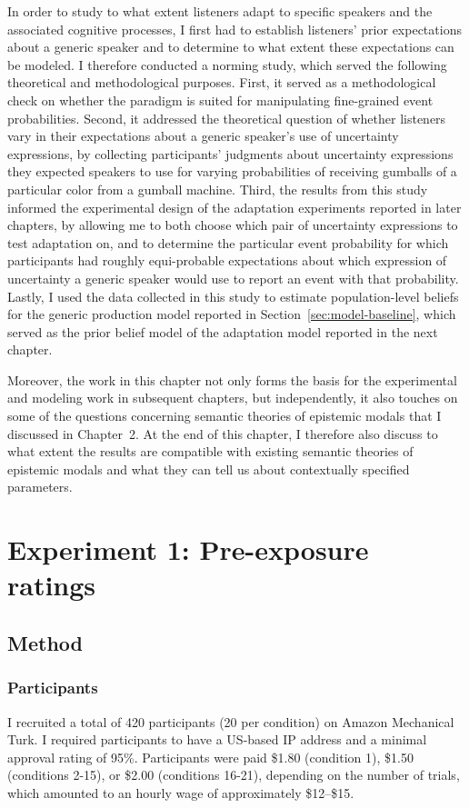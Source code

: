 In order to study to what extent listeners adapt to specific speakers and the associated cognitive processes, 
I first had to establish
listeners' prior expectations about a generic speaker and to determine to what extent these expectations can be modeled.
I therefore conducted a norming study, which served the following theoretical and methodological purposes.
First, it served as a methodological check on whether the paradigm is suited for 
manipulating fine-grained event probabilities. 
Second, it addressed the theoretical question of whether listeners vary in their expectations about
a generic speaker's use of uncertainty expressions, by collecting participants' judgments about 
uncertainty expressions they expected speakers to use for varying probabilities of receiving gumballs of a particular color from a gumball machine. 
Third,  the results from this study informed the experimental design of the adaptation experiments 
reported in later chapters, by allowing me to both choose which pair of uncertainty expressions to test adaptation on, 
and to determine the particular event probability for which participants had roughly equi-probable expectations 
about which expression of uncertainty a generic speaker would use to report an event with that probability. 
Lastly, I used the data collected in this study to 
estimate population-level beliefs for the generic production model reported in 
Section~\ref{sec:model-baseline}, which served as the prior belief model of the
adaptation model reported in the next chapter.

Moreover, the work in this chapter not only forms the basis for the experimental and modeling work in subsequent chapters,
but independently, it also touches on some of the questions concerning
semantic theories of epistemic modals that I discussed in Chapter~2. At the end of this
chapter, I therefore also discuss to what extent the results are compatible with existing semantic theories of epistemic modals
and what they can tell us about contextually specified parameters. 


\section{Experiment 1: Pre-exposure ratings}
\label{sec:exp-norming}

\subsection{Method}

\subsubsection{Participants}
I recruited a total of 420 participants 
(20 per condition) on Amazon Mechanical Turk. 
I required participants to have a US-based IP address and a minimal approval rating of 95\%.
Participants were paid \$1.80 (condition 1), \$1.50 (conditions 2-15),
or \$2.00 (conditions 16-21),
depending on the number of trials,
which amounted to an hourly wage of approximately \$12--\$15. 


